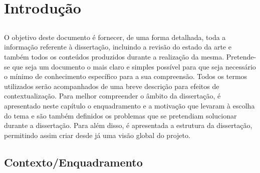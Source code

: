 \chapter{Introdução} \label{chap:intro}

\section*{}

O objetivo deste documento é fornecer, de uma forma detalhada, toda a informação referente à dissertação, incluindo a revisão do estado da arte e também todos os conteúdos produzidos durante a realização da mesma. Pretende-se que seja um documento o mais claro e simples possível para que seja necessário o mínimo de conhecimento específico para a sua compreensão. Todos os termos utilizados serão acompanhados de uma breve descrição para efeitos de contextualização.
Para melhor compreender o âmbito da dissertação, é apresentado neste capítulo o enquadramento e a motivação que levaram à escolha do tema e são também definidos os problemas que se pretendiam solucionar durante a dissertação. Para além disso, é apresentada a estrutura da dissertação, permitindo assim criar desde já uma visão global do projeto.

\section{Contexto/Enquadramento} \label{sec:context}

